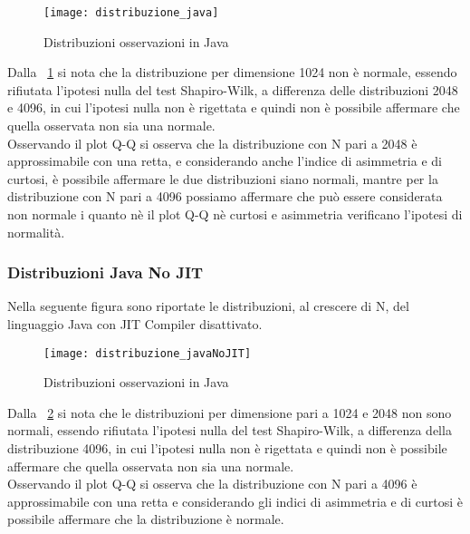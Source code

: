 \begin{figure}[!htbp]
  \texttt{[image: distribuzione\_java]}
  \caption{Distribuzioni osservazioni in Java}
  \label{distribuzione_java}
\end{figure}

Dalla \figurename~\ref{distribuzione_java} si nota
che la distribuzione per dimensione 1024 non è normale, essendo rifiutata
l'ipotesi nulla del test Shapiro-Wilk, a differenza delle distribuzioni 2048 e
4096, in cui l'ipotesi nulla non è rigettata e quindi non è possibile affermare
che quella osservata non sia una normale.\\
Osservando il plot Q-Q si osserva che la distribuzione con N pari a 2048
è approssimabile con una retta, e considerando anche l'indice di asimmetria
e di curtosi, è possibile affermare le due distribuzioni siano normali, mantre
per la distribuzione con N pari a 4096 possiamo affermare che può essere considerata
non normale i quanto nè il plot Q-Q nè curtosi e asimmetria verificano
l'ipotesi di normalità.\\

\clearpage
\subsubsection{Distribuzioni Java No JIT}
Nella seguente figura sono riportate le distribuzioni, al crescere di N, del
linguaggio Java con JIT Compiler disattivato.

\begin{figure}[!htbp]
  \texttt{[image: distribuzione\_javaNoJIT]}
  \caption{Distribuzioni osservazioni in Java}
  \label{distribuzione_javaNoJIT}
\end{figure}

Dalla \figurename~\ref{distribuzione_javaNoJIT} si nota
che le distribuzioni per dimensione pari a 1024 e 2048 non sono normali, essendo
rifiutata l'ipotesi nulla del test Shapiro-Wilk, a differenza della distribuzione
4096, in cui l'ipotesi nulla non è rigettata e quindi non è possibile affermare
che quella osservata non sia una normale.\\
Osservando il plot Q-Q si osserva che la distribuzione con N pari a 4096 è
approssimabile con una retta e considerando gli indici di asimmetria e di
curtosi è possibile affermare che la distribuzione è normale.\\

\clearpage
